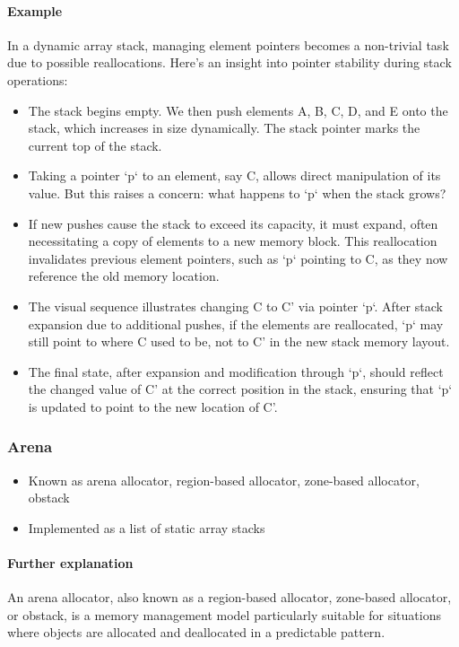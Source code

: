 \documentclass[12pt]{article}
\begin{document}
\paragraph{Example}
In a dynamic array stack, managing element pointers becomes a non-trivial task due to possible reallocations. Here's an insight into pointer stability during stack operations:

\begin{itemize}
    \item The stack begins empty. We then push elements A, B, C, D, and E onto the stack, which increases in size dynamically. The stack pointer marks the current top of the stack.
    
    \item Taking a pointer `p` to an element, say C, allows direct manipulation of its value. But this raises a concern: what happens to `p` when the stack grows?
    
    \item If new pushes cause the stack to exceed its capacity, it must expand, often necessitating a copy of elements to a new memory block. This reallocation invalidates previous element pointers, such as `p` pointing to C, as they now reference the old memory location.
    
    \item The visual sequence illustrates changing C to C' via pointer `p`. After stack expansion due to additional pushes, if the elements are reallocated, `p` may still point to where C used to be, not to C' in the new stack memory layout.
    
    \item The final state, after expansion and modification through `p`, should reflect the changed value of C' at the correct position in the stack, ensuring that `p` is updated to point to the new location of C'.
\end{itemize}

\subsubsection{Arena}

\begin{itemize}
  \item Known as arena allocator, region-based allocator, zone-based allocator, obstack
  \item Implemented as a list of static array stacks
\end{itemize}

\paragraph{Further explanation}
An arena allocator, also known as a region-based allocator, zone-based allocator, or obstack, is a memory management model particularly suitable for situations where objects are allocated and deallocated in a predictable pattern.
\end{document}
